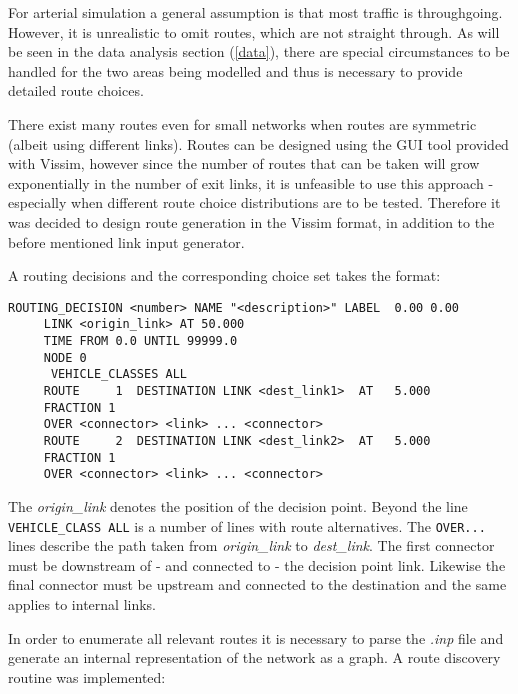 For arterial simulation a general assumption is that most traffic is throughgoing. However, it is unrealistic to omit routes, which are not straight through. As will be seen in the data analysis section (\ref{data}), there are special circumstances to be handled for the two areas being modelled and thus is necessary to provide detailed route choices.

There exist many routes even for small networks when routes are symmetric (albeit using different links). Routes can be designed using the GUI tool provided with Vissim, however since the number of routes that can be taken will grow exponentially in the number of exit links, it is unfeasible to use this approach - especially when different route choice distributions are to be tested. Therefore it was decided to design route generation in the Vissim format, in addition to the before mentioned link input generator.

A routing decisions and the corresponding choice set takes the format:

\begin{verbatim}
ROUTING_DECISION <number> NAME "<description>" LABEL  0.00 0.00
     LINK <origin_link> AT 50.000
     TIME FROM 0.0 UNTIL 99999.0
     NODE 0
      VEHICLE_CLASSES ALL
     ROUTE     1  DESTINATION LINK <dest_link1>  AT   5.000
     FRACTION 1
     OVER <connector> <link> ... <connector>
     ROUTE     2  DESTINATION LINK <dest_link2>  AT   5.000
     FRACTION 1
     OVER <connector> <link> ... <connector>
\end{verbatim}

The \textit{origin_link} denotes the position of the decision point. Beyond the line \verb|VEHICLE_CLASS ALL| is a number of lines with route alternatives. The \verb|OVER...| lines describe the path taken from \textit{origin_link} to \textit{dest_link}. The first connector must be downstream of - and connected to - the decision point link. Likewise the final connector must be upstream and connected to the destination and the same applies to internal links.

In order to enumerate all relevant routes it is necessary to parse the \textit{.inp} file and generate an internal representation of the network as a graph. A route discovery routine was implemented:

